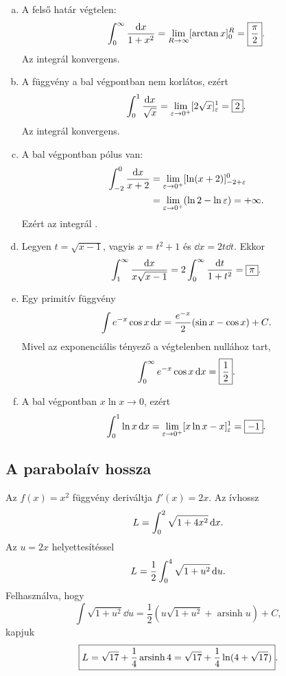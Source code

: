 \documentclass{szb-solution}
\begin{document}
\begin{enumerate}[a)]
  \item A felső határ végtelen:
        $$
          \int_0^\infty\frac{\mathop{}\!\mathrm{d} x}{1+x^2}
          =\lim_{R\to\infty}[\arctan x]_0^R
          =\boxed{\frac\pi2}
          \text.
        $$
        Az integrál konvergens.

  \item A függvény a bal végpontban nem korlátos, ezért
        $$
          \int_0^1\frac{\mathop{}\!\mathrm{d} x}{\sqrt x}
          =\lim_{\varepsilon\to0^+}[2\sqrt x]_{\varepsilon}^{1}
          =\boxed{2}
          \text.
        $$
        Az integrál konvergens.

  \item A bal végpontban pólus van:
        \begin{align*}
          \int_{-2}^0\frac{\mathop{}\!\mathrm{d} x}{x+2}
          &=\lim_{\varepsilon\to0^+}
            [\ln(x+2)]_{-2+\varepsilon}^{0}\\
          &=\lim_{\varepsilon\to0^+}(\ln2-\ln\varepsilon)=+\infty
          \text.
        \end{align*}
        Ezért az integrál .

  \item Legyen $t=\sqrt{x-1}$, vagyis $x=t^2+1$ és
        $\dd x=2t\dd t$. Ekkor
        $$
          \int_1^\infty\frac{\mathop{}\!\mathrm{d} x}{x\sqrt{x-1}}
          =2\int_0^\infty\frac{\mathop{}\!\mathrm{d} t}{1+t^2}
          =\boxed{\pi}
          \text.
        $$

  \item Egy primitív függvény
        $$
          \int e^{-x}\cos x\mathop{}\!\mathrm{d} x
          =\frac{e^{-x}}2(\sin x-\cos x)+C
          \text.
        $$
        Mivel az exponenciális tényező a végtelenben nullához tart,
        $$
          \int_0^\infty e^{-x}\cos x\mathop{}\!\mathrm{d} x
          =\boxed{\frac12}
          \text.
        $$

  \item A bal végpontban $x\ln x\to0$, ezért
        $$
          \int_0^1\ln x\mathop{}\!\mathrm{d} x
          =\lim_{\varepsilon\to0^+}[x\ln x-x]_{\varepsilon}^{1}
          =\boxed{-1}
          \text.
        $$
\end{enumerate}

\subsection{A parabolaív hossza}

Az $f(x)=x^2$ függvény deriváltja $f'(x)=2x$. Az ívhossz
$$
  L=\int_0^2\sqrt{1+4x^2}\mathop{}\!\mathrm{d} x
  \text.
$$
Az $u=2x$ helyettesítéssel
$$
  L=\frac12\int_0^4\sqrt{1+u^2}\mathop{}\!\mathrm{d} u
  \text.
$$
Felhasználva, hogy
$$
  \int\sqrt{1+u^2}\dd u
  =\frac12\left(u\sqrt{1+u^2}+\operatorname{arsinh}u\right)+C,
$$
kapjuk
$$
  \boxed{L=\sqrt{17}+\frac14\operatorname{arsinh}4
  =\sqrt{17}+\frac14\ln(4+\sqrt{17})}
  \text.
$$
\end{document}
